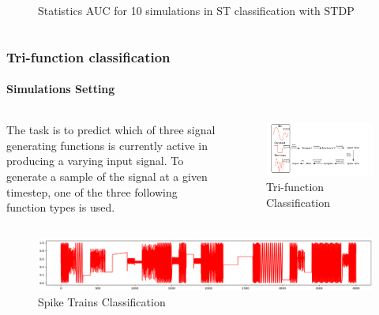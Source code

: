 \documentclass[10pt,aspectratio=43,mathserif, notes]{beamer}
\begin{document}
\begin{frame}
\begin{columns}
\begin{column}{0.5\textwidth}
\begin{figure}[h]
            \caption{Statistics AUC for 10 simulations in ST classification with STDP}
            \label{ST_Task}
            \end{figure}
            \end{column}
            \end{columns}
		\end{frame}
		\begin{frame}
		  \frametitle{\textbf{Tri-function classification}}
		  \framesubtitle{Simulations Setting}
            \begin{columns}
            \begin{column}{0.5\textwidth}
            The task is to predict which of three signal generating functions is currently active in producing a varying input signal. To generate a sample of the signal at a given timestep, one of the three following function types is used.
            \end{column}
            \begin{column}{0.5\textwidth}
           \begin{figure}[h]
            \centering
            \includegraphics[width=1.0\linewidth]{image/sim3.pdf}
            \caption{Tri-function Classification}
            \label{Tri_Task}
            \end{figure}
            \end{column}
            \end{columns}
           \begin{figure}[h]
            \centering
            \includegraphics[width=0.9\linewidth]{image/Tri_data.png}
            \caption{Spike Trains Classification}
            \label{Tri_Data}
            \end{figure}
		\end{frame}
\end{document}

